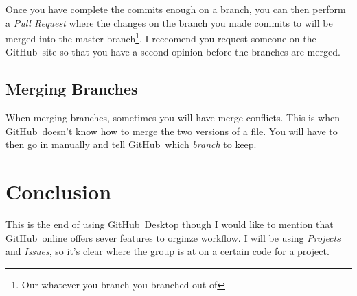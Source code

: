 \documentclass{article}
\newcommand{\gh}{GitHub~}
\begin{document}
Once you have complete the commits enough on a branch, you can then perform a \textit{Pull Request} where the changes on the branch you made commits to will be merged into the master branch\footnote{Our whatever you branch you branched out of}. I reccomend you request someone on the \gh site so that you have a second opinion before the branches are merged.

\subsection{Merging Branches}

When merging branches, sometimes you will have merge conflicts. This is when \gh doesn't know how to merge the two versions of a file. You will have to then go in manually and tell \gh which \textit{branch} to keep.

\section{Conclusion}

This is the end of using \gh Desktop though I would like to mention that \gh online offers sever features to orginze workflow. I will be using \textit{Projects} and \textit{Issues}, so it's clear where the group is at on a certain code for a project.
\end{document}
